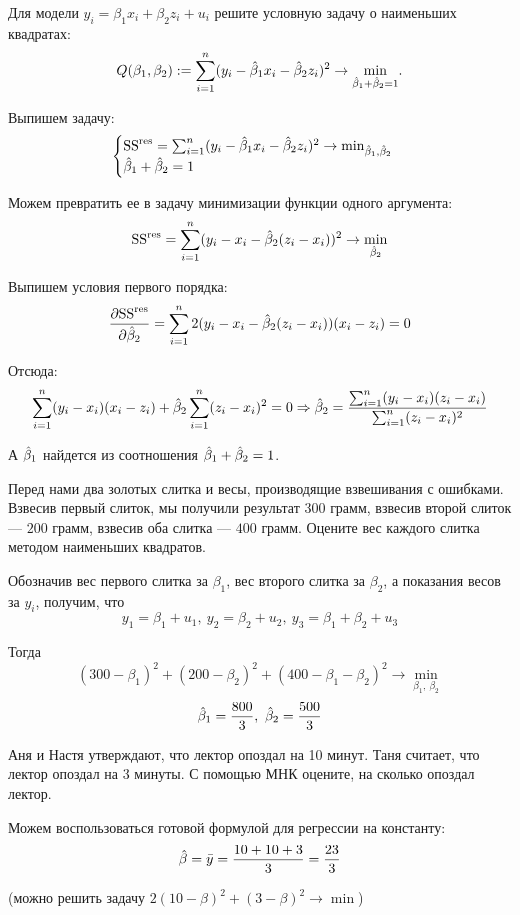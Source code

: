 \begin{problem}
Для модели $y_i = \beta_1 x_i + \beta_2 z_i + u_i$ решите условную задачу о наименьших квадратах:
\[
Q(\beta_1, \beta_2) := \sum_{i=1}^n (y_i - \hat{\beta}_1 x_i - \hat{\beta}_2 z_i)^2 \to \underset{\hat{\beta}_1 + \hat{\beta}_2 = 1}{\min}.
\]


\begin{sol}
Выпишем задачу:
\[
\begin{cases}
\mathrm{SS}^{\text{res}} = \sum_{i=1}^{n}(y_i - \hat{\beta}_1x_i - \hat{\beta}_2z_i)^2 \to \min_{\hat{\beta}_1, \hat{\beta}_2}\\
\hat{\beta}_1 + \hat{\beta}_2 = 1
\end{cases}
\]

Можем превратить ее в задачу минимизации функции одного аргумента:
\[
\mathrm{SS}^{\text{res}} =  \sum_{i=1}^{n}(y_i - x_i - \hat{\beta}_2(z_i-x_i))^2 \to \min_{\hat{\beta}_2}
\]

Выпишем условия первого порядка:
\[
\frac{\partial \mathrm{SS}^{\text{res}}}{\partial \hat{\beta}_2} = \sum_{i=1}^{n}2(y_i-x_i-\hat{\beta}_2(z_i-x_i))(x_i-z_i)=0
\]

Отсюда:
\[
\sum_{i=1}^{n}(y_i-x_i)(x_i-z_i) + \hat{\beta}_2\sum_{i=1}^{n}(z_i-x_i)^2 = 0 \Rightarrow \hat{\beta}_2 = \frac{\sum_{i=1}^n (y_i-x_i)(z_i-x_i)}{\sum_{i=1}^n (z_i-x_i)^2}
\]

А $\hat{\beta}_1$ найдется из соотношения $\hat{\beta}_1+\hat{\beta}_2 = 1$.

\end{sol}
\end{problem}

\begin{problem}
Перед нами два золотых слитка и весы, производящие взвешивания с ошибками. 
Взвесив первый слиток, мы получили результат $300$ грамм, взвесив второй слиток — $200$ грамм, взвесив оба слитка — $400$ грамм. 
Оцените вес каждого слитка методом наименьших квадратов.

\begin{sol}
Обозначив вес первого слитка за \(\beta_1\), вес второго слитка за \(\beta_2\), а показания весов за \(y_i\), получим, что
\[y_1 = \beta_1 + u_1, \ y_2 = \beta_2 + u_2, \ y_3 = \beta_1 + \beta_2 + u_3\]

Тогда
\[(300 - \beta_1)^2 + (200 - \beta_2)^2 + (400 - \beta_1 - \beta_2)^2 \to \min _{\beta_1,\  \beta_2} \]
\[\hat{\beta}_1 = \frac{800}{3}, \ \hat{\beta}_2 = \frac{500}{3} \]
\end{sol}
\end{problem}


\begin{problem}
Аня и Настя утверждают, что лектор опоздал на 10 минут. 
Таня считает, что лектор опоздал на 3 минуты. 
С помощью МНК оцените, на сколько опоздал лектор.

\begin{sol}
Можем воспользоваться готовой формулой для регрессии на константу:
\[
\hat{\beta} = \bar{y} = \frac{10+10+3}{3} = \frac{23}{3}
\]

(можно решить задачу $2(10-\beta)^2 + (3-\beta)^2\to \min$)

\end{sol}
\end{problem}

